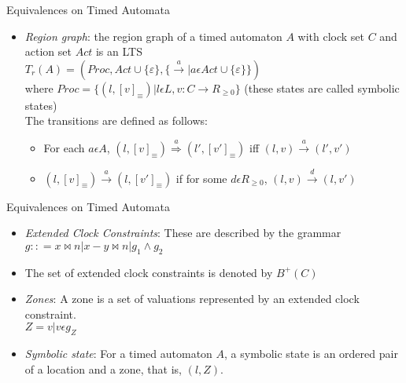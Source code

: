 \documentclass{beamer}
\begin{document}
\begin{frame}{Equivalences on Timed Automata}

  \begin{itemize}

  \item \emph{Region graph}: the region graph of a timed automaton $A$ with clock set $C$
    and action set $Act$ is an LTS\\
    $T_r(A) = (Proc,Act \cup \{\varepsilon\}, \{\xrightarrow{a}|a \epsilon
    Act \cup \{\varepsilon\}\})$\\
    where $Proc = \{(l, [v]_{\equiv}) | l \epsilon L, v: C \rightarrow
    R_{\ge 0}\}$ (these states are called symbolic states)\\
    The transitions are defined as follows:
    \begin{itemize}
    \item For each $a \epsilon A$, $(l, [v]_{\equiv})
      \overset{a}{\Rightarrow} (l', [v']_{\equiv})$ iff $(l,v)
      \overset{a}{\rightarrow} (l', v')$
    \item $(l, [v]_{\equiv}) \xrightarrow{a} (l, [v']_{\equiv})$ if
      for some $d \epsilon R_{\ge 0}$, $(l, v) \xrightarrow{d} (l,
      v')$
    \end{itemize}
    
  \end{itemize}

\end{frame}

\begin{frame}{Equivalences on Timed Automata}

  \begin{itemize}

    \item \emph{Extended Clock Constraints}: These are described by the  grammar\\
    $g :: = x \bowtie n | x - y \bowtie n | g_1 \wedge g_2$\\

    \item The set of extended clock constraints is denoted by $B^+(C)$

    \item \emph{Zones}: A zone is a set of valuations represented by an
      extended clock constraint.\\
      $Z = {v|v \epsilon g_Z}$

    \item \emph{Symbolic state}: For a timed automaton $A$, a symbolic
      state is an ordered pair of a location and a zone, that is, $(l,
      Z)$.

  \end{itemize}

\end{frame}
\end{document}
